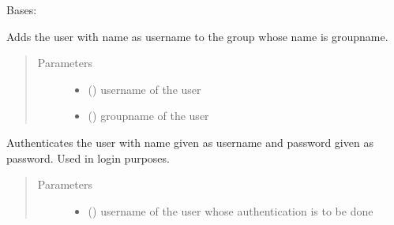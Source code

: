 \documentclass[letterpaper,10pt,english]{sphinxmanual}
\begin{document}
\begin{fulllineitems}
\label{\detokenize{sql:sql.Database}}
Bases: 

\begin{fulllineitems}
\label{\detokenize{sql:sql.Database.add_user_to_group}}
Adds the user with name as username to the group whose name is groupname.
\begin{quote}\begin{description}
\item[{Parameters}] \leavevmode\begin{itemize}
\item {} 
 () \textendash{} username of the user

\item {} 
 () \textendash{} groupname of the user

\end{itemize}

\end{description}\end{quote}

\end{fulllineitems}


\begin{fulllineitems}
\label{\detokenize{sql:sql.Database.authenticate}}
Authenticates the user with name given as username and password given as password. Used in login purposes.
\begin{quote}\begin{description}
\item[{Parameters}] \leavevmode\begin{itemize}
\item {} 
 () \textendash{} username of the user whose authentication is to be done


\end{itemize}
\end{description}
\end{quote}
\end{fulllineitems}
\end{fulllineitems}
\end{document}
